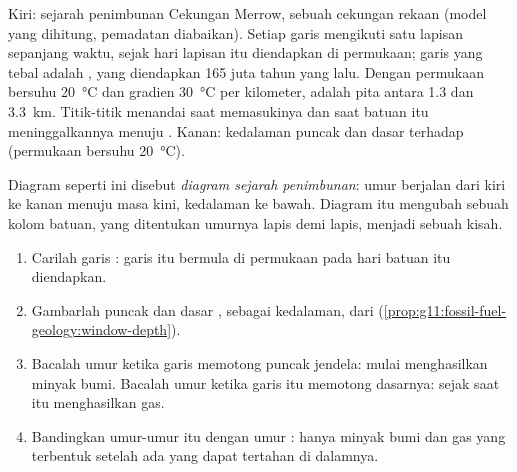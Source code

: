 \begin{omfigure}
{\small Kiri: sejarah penimbunan Cekungan Merrow, sebuah cekungan rekaan (model
yang dihitung, pemadatan diabaikan). Setiap garis mengikuti satu lapisan
sepanjang waktu, sejak hari lapisan itu diendapkan di permukaan; garis yang
tebal adalah , yang diendapkan 165 juta tahun yang lalu. Dengan
permukaan bersuhu \qty{20}{\degreeCelsius} dan gradien
\qty{30}{\degreeCelsius} per kilometer,  adalah pita antara
\num{1.3} dan \qty{3.3}{km}. Titik-titik menandai saat  memasukinya
dan saat batuan itu meninggalkannya menuju . Kanan: kedalaman puncak
dan dasar  terhadap  (permukaan bersuhu
\qty{20}{\degreeCelsius}).}
\end{omfigure}

Diagram seperti ini disebut \emph{diagram sejarah penimbunan}: umur berjalan
dari kiri ke kanan menuju masa kini, kedalaman ke bawah. Diagram itu mengubah
sebuah kolom batuan, yang ditentukan umurnya lapis demi lapis, menjadi sebuah
kisah.

\begin{method}\label{met:g11:fossil-fuel-geology:burial}
\begin{enumerate}
  \item Carilah garis : garis itu bermula di permukaan pada hari
        batuan itu diendapkan.
  \item Gambarlah puncak dan dasar , sebagai kedalaman, dari
         (\cref{prop:g11:fossil-fuel-geology:window-depth}).
  \item Bacalah umur ketika garis  memotong puncak jendela:  mulai menghasilkan minyak bumi. Bacalah umur ketika garis itu
        memotong dasarnya: sejak saat itu  menghasilkan gas.
  \item Bandingkan umur-umur itu dengan umur : hanya minyak bumi dan
        gas yang terbentuk setelah  ada yang dapat tertahan di
        dalamnya.
\end{enumerate}
\end{method}

